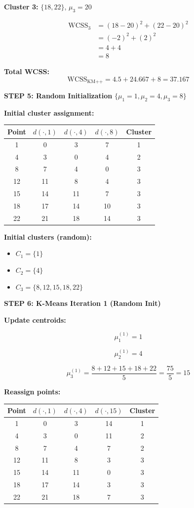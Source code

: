 \documentclass[12pt]{article}
\begin{document}
\begin{solution}
\textbf{Cluster 3:} $\{18, 22\}$, $\mu_3 = 20$

\begin{align*}
\text{WCSS}_3 &= (18 - 20)^2 + (22 - 20)^2 \\
&= (-2)^2 + (2)^2 \\
&= 4 + 4 \\
&= 8
\end{align*}

\textbf{Total WCSS:}
\[
\text{WCSS}_{\text{KM++}} = 4.5 + 24.667 + 8 = 37.167
\]

\textbf{STEP 5: Random Initialization} $\{\mu_1=1, \mu_2=4, \mu_3=8\}$

\textbf{Initial cluster assignment:}

\begin{center}
\begin{tabular}{c|c|c|c|c}
Point & $d(\cdot, 1)$ & $d(\cdot, 4)$ & $d(\cdot, 8)$ & Cluster \\
\hline
1 & 0 & 3 & 7 & 1 \\
4 & 3 & 0 & 4 & 2 \\
8 & 7 & 4 & 0 & 3 \\
12 & 11 & 8 & 4 & 3 \\
15 & 14 & 11 & 7 & 3 \\
18 & 17 & 14 & 10 & 3 \\
22 & 21 & 18 & 14 & 3 \\
\end{tabular}
\end{center}

\textbf{Initial clusters (random):}
\begin{itemize}
    \item $C_1 = \{1\}$
    \item $C_2 = \{4\}$
    \item $C_3 = \{8, 12, 15, 18, 22\}$
\end{itemize}

\textbf{STEP 6: K-Means Iteration 1 (Random Init)}

\textbf{Update centroids:}

\[
\mu_1^{(1)} = 1
\]

\[
\mu_2^{(1)} = 4
\]

\[
\mu_3^{(1)} = \frac{8 + 12 + 15 + 18 + 22}{5} = \frac{75}{5} = 15
\]

\textbf{Reassign points:}

\begin{center}
\begin{tabular}{c|c|c|c|c}
Point & $d(\cdot, 1)$ & $d(\cdot, 4)$ & $d(\cdot, 15)$ & Cluster \\
\hline
1 & 0 & 3 & 14 & 1 \\
4 & 3 & 0 & 11 & 2 \\
8 & 7 & 4 & 7 & 2 \\
12 & 11 & 8 & 3 & 3 \\
15 & 14 & 11 & 0 & 3 \\
18 & 17 & 14 & 3 & 3 \\
22 & 21 & 18 & 7 & 3 \\
\end{tabular}
\end{center}


\end{solution}
\end{document}
